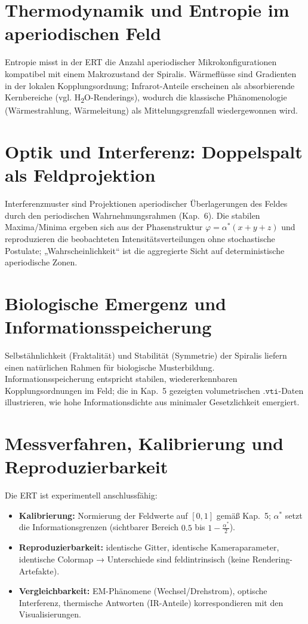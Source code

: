 \section{Thermodynamik und Entropie im aperiodischen Feld}
\label{sec:thermodynamik}
Entropie misst in der ERT die Anzahl aperiodischer Mikrokonfigurationen kompatibel mit einem Makrozustand der Spiralis.
Wärmeflüsse sind Gradienten in der lokalen Kopplungsordnung; Infrarot-Anteile erscheinen als absorbierende Kernbereiche (vgl. H\textsubscript{2}O-Renderings), 
wodurch die klassische Phänomenologie (Wärmestrahlung, Wärmeleitung) als Mittelungsgrenzfall wiedergewonnen wird.

\section{Optik und Interferenz: Doppelspalt als Feldprojektion}
\label{sec:doppelspalt}
Interferenzmuster sind Projektionen aperiodischer Überlagerungen des Feldes durch den periodischen Wahrnehmungsrahmen (Kap.~6).
Die stabilen Maxima/Minima ergeben sich aus der Phasenstruktur \(\varphi=\alpha^*(x+y+z)\) und reproduzieren die beobachteten Intensitätsverteilungen ohne stochastische Postulate; 
„Wahrscheinlichkeit“ ist die aggregierte Sicht auf deterministische aperiodische Zonen.

\section{Biologische Emergenz und Informationsspeicherung}
\label{sec:biologie}
Selbstähnlichkeit (Fraktalität) und Stabilität (Symmetrie) der Spiralis liefern einen natürlichen Rahmen für biologische Musterbildung. 
Informationsspeicherung entspricht stabilen, wiedererkennbaren Kopplungsordnungen im Feld; 
die in Kap.~5 gezeigten volumetrischen \(\texttt{.vti}\)-Daten illustrieren, wie hohe Informationsdichte aus minimaler Gesetzlichkeit emergiert.

\section{Messverfahren, Kalibrierung und Reproduzierbarkeit}
\label{sec:anschluss}
Die ERT ist experimentell anschlussfähig:
\begin{itemize}
  \item \textbf{Kalibrierung:} Normierung der Feldwerte auf \([0,1]\) gemäß Kap.~5; \(\alpha^*\) setzt die Informationsgrenzen (sichtbarer Bereich \(0.5\) bis \(1-\tfrac{\alpha^*}{2}\)).
  \item \textbf{Reproduzierbarkeit:} identische Gitter, identische Kameraparameter, identische Colormap → Unterschiede sind feldintrinsisch (keine Rendering-Artefakte).
  \item \textbf{Vergleichbarkeit:} EM-Phänomene (Wechsel/Drehstrom), optische Interferenz, thermische Antworten (IR-Anteile) korrespondieren mit den Visualisierungen.
\end{itemize}

